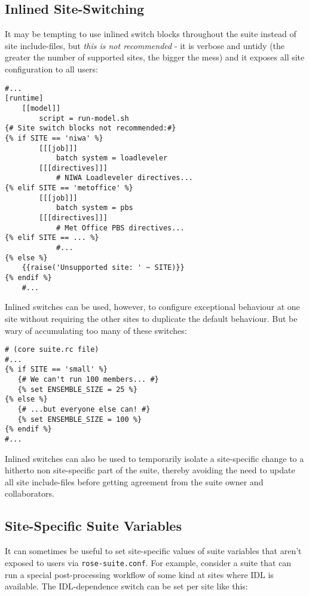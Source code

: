 \subsection{Inlined Site-Switching}
\label{Inlined Site-Switching}

It may be tempting to use inlined switch blocks throughout the suite instead of
site include-files, but {\em this is not recommended} - it is verbose and
untidy (the greater the number of supported sites, the bigger the
mess) and it exposes all site configuration to all users:

\lstset{language=suiterc}
\begin{lstlisting}
#...
[runtime]
    [[model]]
        script = run-model.sh
{# Site switch blocks not recommended:#}
{% if SITE == 'niwa' %}
        [[[job]]]
            batch system = loadleveler
        [[[directives]]]
            # NIWA Loadleveler directives...
{% elif SITE == 'metoffice' %}
        [[[job]]]
            batch system = pbs
        [[[directives]]]
            # Met Office PBS directives...
{% elif SITE == ... %}
            #...
{% else %}
    {{raise('Unsupported site: ' ~ SITE)}}
{% endif %}
    #...
\end{lstlisting}

Inlined switches can be used, however, to configure exceptional behaviour at
one site without requiring the other sites to duplicate the default behaviour.
But be wary of accumulating too many of these switches:

\lstset{language=suiterc}
\begin{lstlisting}
# (core suite.rc file)
#...
{% if SITE == 'small' %}
   {# We can't run 100 members... #}
   {% set ENSEMBLE_SIZE = 25 %}
{% else %}
   {# ...but everyone else can! #}
   {% set ENSEMBLE_SIZE = 100 %}
{% endif %}
#...
\end{lstlisting}

Inlined switches can also be used to temporarily isolate a site-specific
change to a hitherto non site-specific part of the suite, thereby avoiding the
need to update all site include-files before getting agreement from the suite
owner and collaborators.

\subsection{Site-Specific Suite Variables}

It can sometimes be useful to set site-specific values of suite variables that
aren't exposed to users via \lstinline=rose-suite.conf=. For example, consider
a suite that can run a special post-processing workflow of some kind at sites
where IDL is available. The IDL-dependence switch can be set per site like this: 

